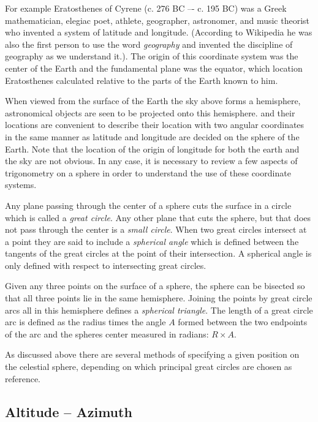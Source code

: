 For example Eratosthenes of Cyrene (c. 276 BC –- c. 195 BC) was a Greek mathematician, elegiac poet, athlete, geographer, astronomer, and music theorist who invented a system of latitude
and longitude. (According to Wikipedia he was also the first person to use the word {\it geography} and invented the discipline of geography as we understand it.). The origin of 
this coordinate system was the center of the Earth and the fundamental plane was the 
equator, which location Eratosthenes calculated relative to the parts of the Earth known
to him. 

When viewed from the surface of the Earth the sky above forms a hemisphere, 
astronomical objects are seen to be projected onto this hemisphere. and their 
locations are convenient to describe their location with two angular coordinates in the
same manner as latitude and longitude are decided on the sphere of the Earth. 
Note that the location of the origin of longitude for both the earth and the 
sky are not obvious. In any case, it is necessary to review a few aspects of 
trigonometry on a sphere in order to understand the use of these coordinate 
systems.

Any plane passing through the center of a sphere cuts the surface in a
circle which is called a {\it great circle}. Any other plane that cuts
the sphere, but that does not pass through the center is a {\it small
  circle}. When two great circles intersect at a point they are said
to include a {\it spherical angle} which is defined between the
tangents of the great circles at the point of their intersection. A
spherical angle is only defined with respect to intersecting great
circles.

Given any three points on the surface of a sphere, the sphere can be
bisected so that all three points lie in the same hemisphere. Joining
the points by great circle arcs all in this hemisphere defines a {\it
  spherical triangle}. The length of a great circle arc is defined as
the radius times the angle $A$ formed between the two endpoints of the
arc and the spheres center measured in radians: $R\times A$.

As discussed above there are several methods of specifying a given position on the
celestial sphere, depending on which principal great circles are
chosen as reference. 

\subsection{Altitude -- Azimuth}

